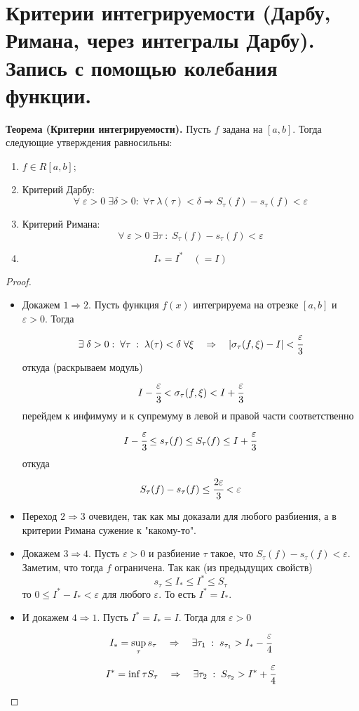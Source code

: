 \documentclass{article}
\newcommand*{\theorem}[2]{\textbf{Теорема #1. } #2 \newline}
\begin{document}
\section{Критерии интегрируемости (Дарбу, Римана, через интегралы Дарбу). Запись с помощью колебания функции.}
\theorem{(Критерии интегрируемости)}{Пусть $f$ задана на $[a, b]$. Тогда следующие утверждения равносильны:}
\begin{enumerate}
    \item $f \in R[a, b]$;
    \item Критерий Дарбу:
    $$
        \forall \; \varepsilon > 0 \; \exists \delta > 0: \; \forall \tau \; \lambda(\tau) < \delta \Rightarrow S_\tau(f) - s_\tau(f) < \varepsilon
    $$
    \item Критерий Римана:
    $$
        \forall \; \varepsilon > 0 \; \exists \tau \; : \; S_\tau(f) - s_\tau(f) < \varepsilon
    $$
    \item 
    $$
        I_* = I^* \quad (= I)
    $$
\end{enumerate}
\begin{proof}
    \begin{itemize}
        \item Докажем $1 \Rightarrow 2$. Пусть функция $f(x)$ интегрируема на отрезке $[a, b]$ и $\varepsilon > 0$. Тогда 
        $$
            \exists \; \delta > 0: \; \forall \tau \; : \; \lambda(\tau) < \delta \; \forall \xi \quad \Rightarrow \quad |\sigma_\tau(f, \xi) - I| < \cfrac{\varepsilon}{3}
        $$
        откуда (раскрываем модуль)
        $$
            I - \cfrac{\varepsilon}{3} < \sigma_\tau(f, \xi) < I + \cfrac{\varepsilon}{3}
        $$
        перейдем к инфимуму и к супремуму в левой и правой части соответственно
        $$
            I - \cfrac{\varepsilon}{3} \leq s_\tau(f) \leq S_\tau(f) \leq I + \cfrac{\varepsilon}{3}
        $$
        откуда 
        $$
            S_\tau(f) - s_\tau(f) \leq \cfrac{2\varepsilon}{3} < \varepsilon    
        $$
        \item Переход $2 \Rightarrow 3$ очевиден, так как мы доказали для любого разбиения, а в критерии Римана сужение к "какому-то".
        \item Докажем $3 \Rightarrow 4$. Пусть $\varepsilon > 0$ и разбиение $\tau$ такое, что $S_\tau(f) - s_\tau(f) < \varepsilon$. Заметим, что тогда $f$ ограничена. Так как (из предыдущих свойств)
        $$
            s_\tau \leq I_* \leq I^* \leq S_\tau
        $$
        то $0 \leq I^* - I_* < \varepsilon$ для любого $\varepsilon$. То есть $I^* = I_*$.
        \item И докажем $4 \Rightarrow 1$. Пусть $I^* = I_* = I$. Тогда для $\varepsilon > 0$
        $$
            I_* = \displaystyle \sup_\tau s_\tau \quad \Rightarrow \quad \exists\tau_1 \; : \; s_{\tau_1} > I_* - \cfrac{\varepsilon}{4}
        $$
        $$
            I^* = \displaystyle \inf\tau S_\tau \quad \Rightarrow \quad \exists\tau_2 \; : \; S_{\tau_2} > I^* + \cfrac{\varepsilon}{4}
        $$
    \end{itemize}
\end{proof}
\end{document}
